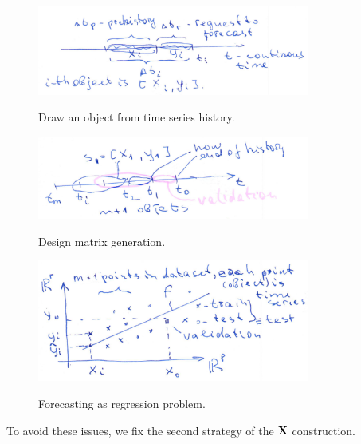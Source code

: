 \documentclass[12pt]{article}
\begin{document}
\begin{figure}[!ht]
\centering\includegraphics[width=0.8\textwidth]{draw_object.png}
\label{fg:draw}
\caption{Draw an object from time series history.}
\end{figure}
\begin{figure}[!ht]
\centering\includegraphics[width=0.8\textwidth]{design_matrix_generation.png}
\label{fg:design}
\caption{Design matrix generation.}
\end{figure}

\begin{figure}[!ht]
\centering\includegraphics[width=0.8\textwidth]{forecasting_model.png}
\label{fg:forecasting}
\caption{Forecasting as regression problem.}
\end{figure}

To avoid these issues, we fix the second strategy of the ${\mathbf{X}}$ construction.
\end{document}
